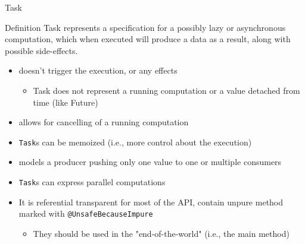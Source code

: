 \documentclass[presentation, 9pt]{beamer}\mode<presentation>{\usetheme{AMSBolognaFC}}
\begin{document}
\begin{frame}{Task \href{https://monix.io/docs/current/eval/task.html}{\faLink}}
	\begin{alertblock}{Definition}
		Task represents a specification for a possibly lazy or asynchronous
computation, which when executed will produce a data as a result, along
with possible side-effects.
	\end{alertblock}
	\begin{itemize}
  	\item doesn’t trigger the execution, or any effects 
		\begin{itemize}
			\item  Task does not represent a running computation or a value detached from time (like Future)
		\end{itemize}
   	\item allows for cancelling of a running computation
    \item \texttt{Task}s can be memoized (i.e., more control about the execution)
    \item models a producer pushing only one value to one or multiple consumers
    \item \texttt{Task}s can express parallel computations
    \item It is referential transparent for most of the API, contain unpure method marked with \texttt{@UnsafeBecauseImpure}
    \begin{itemize}
			\item They should be used in the "end-of-the-world" (i.e., the main method)
		\end{itemize}
	\end{itemize}
\end{frame}
\end{document}
